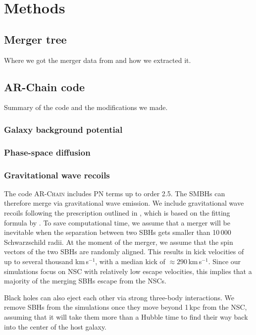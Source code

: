 \section{Methods}

\subsection{Merger tree}
Where we got the merger data from and how we extracted it.

\subsection{AR-Chain code}
Summary of the code and the modifications we made.

\subsubsection{Galaxy background potential}

\subsubsection{Phase-space diffusion}

\subsubsection{Gravitational wave recoils}
The code \textsc{AR-Chain} includes PN terms up to order 2.5. The SMBHs can therefore merge via gravitational wave emission. We include gravitational wave recoils following the prescription outlined in \citet{Kulier_2015}, which is based on the fitting formula by \citet{Lousto12}. To save computational time, we assume that a merger will be inevitable when the separation between two SBHs gets smaller than 10\,000 Schwarzschild radii. At the moment of the merger, we assume that the spin vectors of the two SBHs are randomly aligned. This results in kick velocities of up to several thousand km\,s$^{-1}$, with a median kick of $\approx 290$\,km\,s$^{-1}$. Since our simulations focus on NSC with relatively low escape velocities, this implies that a majority of the merging SBHs escape from the NSCs. 

Black holes can also eject each other via strong three-body interactions. We remove SBHs from the simulations once they move beyond 1\,kpc from the NSC, assuming that it will take them more than a Hubble time to find their way back into the center of the host galaxy.


